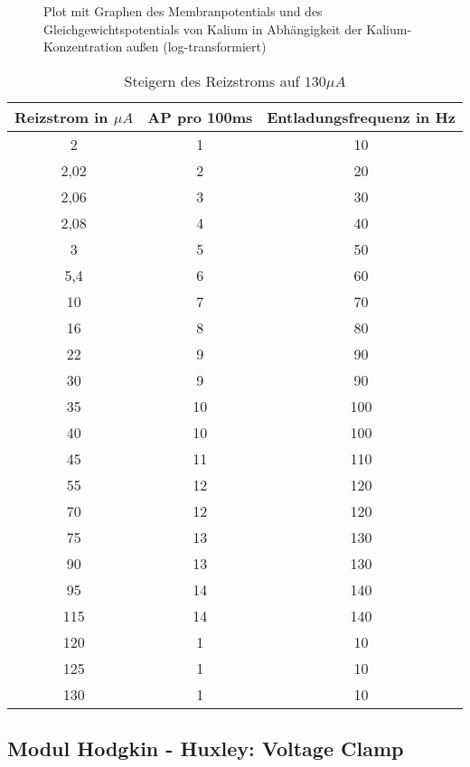 \documentclass[11pt]{article}
\begin{document}
\begin{figure}[H]
\caption{Plot mit Graphen des Membranpotentials und des Gleichgewichtspotentials von Kalium in Abhängigkeit der Kalium-Konzentration außen (log-transformiert)}
\label{plot}
\end{figure}





\begin{table}[H]
\caption{Steigern des Reizstroms auf $130 \mu A$}
\begin{center}
\begin{tabular}{c|c|c}
Reizstrom in $\mu A$ & AP pro 100ms & Entladungsfrequenz in Hz \\
\hline\hline
2	&	1	&	10	\\
2,02	&	2	&	20	\\
2,06	&	3	&	30	\\
2,08	&	4	&	40	\\
3	&	5	&	50	\\
5,4	&	6	&	60	\\
10	&	7	&	70	\\
16	&	8	&	80	\\
22	&	9	&	90	\\
30	&	9	&	90	\\
35	&	10	&	100	\\
40	&	10	&	100	\\
45	&	11	&	110	\\
55	&	12	&	120	\\
70	&	12	&	120	\\
75	&	13	&	130	\\
90	&	13	&	130	\\
95	&	14	&	140	\\
115	&	14	&	140	\\
120	&	1	&	10	\\
125	&	1	&	10	\\
130	&	1	&	10	
\end{tabular}
\end{center}
\label{werte}
\end{table}

\subsection{Modul Hodgkin - Huxley: Voltage Clamp}
\end{document}
